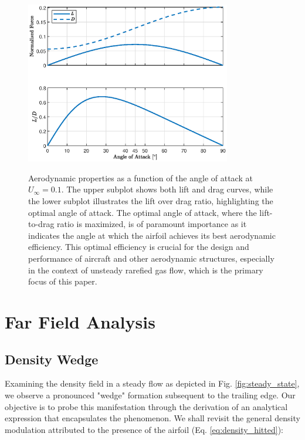 \begin{figure}[h]
    \centering
    \caption{
    \footnotesize
    Aerodynamic properties as a function of the angle of attack at \( U_\infty = 0.1 \). The upper subplot shows both lift and drag curves, while the lower subplot illustrates the lift over drag ratio, highlighting the optimal angle of attack. The optimal angle of attack, where the lift-to-drag ratio is maximized, is of paramount importance as it indicates the angle at which the airfoil achieves its best aerodynamic efficiency. This optimal efficiency is crucial for the design and performance of aircraft and other aerodynamic structures, especially in the context of unsteady rarefied gas flow, which is the primary focus of this paper.}
    \includegraphics[width=0.8\textwidth]{drawings/U.1_lift_drag.eps}
    \label{fig:aerodynamic_properties_vs_alpha}
\end{figure}

\newpage

\section{Far Field Analysis}
\subsection{Density Wedge}
Examining the density field in a steady flow as depicted in Fig. \ref{fig:steady_state}, we observe a pronounced "wedge" formation subsequent to the trailing edge. Our objective is to probe this manifestation through the derivation of an analytical expression that encapsulates the phenomenon. We shall revisit the general density modulation attributed to the presence of the airfoil (Eq. \ref{eq:density_hitted}):

